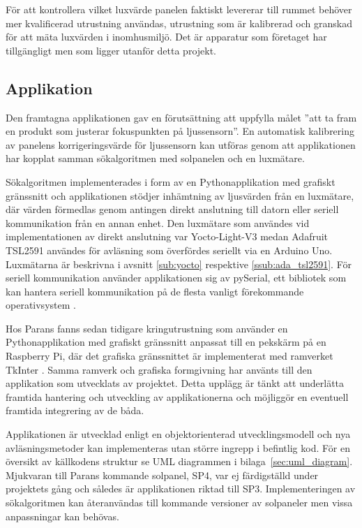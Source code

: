             För att kontrollera vilket luxvärde panelen faktiskt levererar till rummet behöver mer kvalificerad utrustning användas, utrustning som är kalibrerad och granskad för att mäta luxvärden i inomhusmiljö. Det är apparatur som företaget har tillgängligt men som ligger utanför detta projekt.

    \subsection{Applikation} %
    \label{sub:applikation}
        Den framtagna applikationen gav en förutsättning att uppfylla målet ''att ta fram en produkt som justerar fokuspunkten på ljussensorn''. En automatisk kalibrering av panelens korrigeringsvärde för ljussensorn kan utföras genom att applikationen har kopplat samman sökalgoritmen med solpanelen och en luxmätare.\bigskip

        Sökalgoritmen implementerades i form av en Pythonapplikation med grafiskt gränssnitt och applikationen stödjer inhämtning av ljusvärden från en luxmätare, där värden förmedlas genom antingen direkt anslutning till datorn eller seriell kommunikation från en annan enhet. Den luxmätare som användes vid implementationen av direkt anslutning var Yocto-Light-V3 medan Adafruit TSL2591 användes för avläsning som överfördes seriellt via en Arduino Uno. Luxmätarna är beskrivna i avsnitt \ref{sub:yocto} respektive \ref{ssub:ada_tsl2591}. För seriell kommunikation använder applikationen sig av pySerial, ett bibliotek som kan hantera seriell kommunikation på de flesta vanligt förekommande operativsystem \cite{pyserial}. \bigskip

        Hos Parans fanns sedan tidigare kringutrustning som använder en Pythonapplikation med grafiskt gränssnitt anpassat till en pekskärm på en Raspberry Pi, där det grafiska gränssnittet är implementerat med ramverket TkInter \cite{solarremote}. Samma ramverk och grafiska formgivning har använts till den applikation som utvecklats av projektet. Detta upplägg är tänkt att underlätta framtida hantering och utveckling av applikationerna och möjliggör en eventuell framtida integrering av de båda. \bigskip

        Applikationen är utvecklad enligt en objektorienterad utvecklingsmodell och nya avläsningsmetoder kan implementeras utan större ingrepp i befintlig kod. För en översikt av källkodens struktur se UML diagrammen i bilaga~\ref{sec:uml_diagram}. Mjukvaran till Parans kommande solpanel, SP4, var ej färdigställd under projektets gång och således är applikationen riktad till SP3. Implementeringen av sökalgoritmen kan återanvändas till kommande versioner av solpaneler men vissa anpassningar kan behövas.
